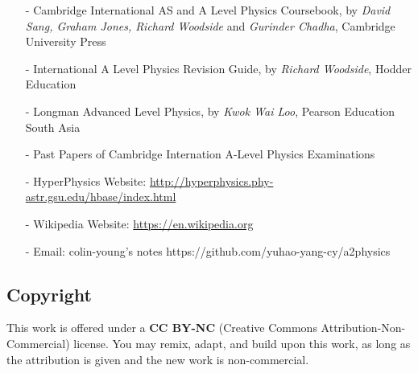 \begin{itemize}
\item[-] Cambridge International AS and A Level Physics Coursebook, by \textit{David Sang, Graham Jones, Richard Woodside} and \textit{Gurinder Chadha}, Cambridge University Press

\item[-] International A Level Physics Revision Guide, by \textit{Richard Woodside}, Hodder Education

\item[-] Longman Advanced Level Physics, by \textit{Kwok Wai Loo},	Pearson Education South Asia

\item[-] Past Papers of Cambridge Internation A-Level Physics Examinations

\item[-] HyperPhysics Website: \url{http://hyperphysics.phy-astr.gsu.edu/hbase/index.html}

\item[-] Wikipedia Website: \url{https://en.wikipedia.org}

\item [-] Email: colin-young's notes https://github.com/yuhao-yang-cy/a2physics
\end{itemize}

\subsection*{Copyright}

This work is offered under a \textbf{CC BY-NC} (Creative Commons Attribution-Non-Commercial) license. You may remix, adapt, and build upon this work, as long as the attribution is given and the new work is non-commercial.